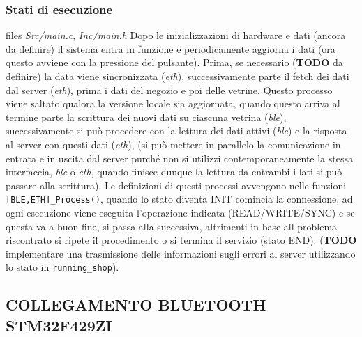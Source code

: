 \documentclass{article}
\begin{document}
\subsubsection{Stati di esecuzione}
files \textit{Src/main.c}, \textit{Inc/main.h}
Dopo le inizializzazioni di hardware e dati (ancora da definire) il sistema entra in funzione e periodicamente aggiorna i dati (ora questo avviene con la pressione del pulsante). Prima, se necessario (\textbf{TODO} da definire) la data viene sincronizzata (\textit{eth}), successivamente parte il fetch dei dati dal server (\textit{eth}), prima i dati del negozio e poi delle vetrine. Questo processo viene saltato qualora la versione locale sia aggiornata, quando questo arriva al termine parte la scrittura dei nuovi dati su ciascuna vetrina (\textit{ble}), successivamente si pu\`{o} procedere con la lettura dei dati attivi (\textit{ble}) e la risposta al server con questi dati (\textit{eth}), (si pu\`{o} mettere in parallelo la comunicazione in entrata e in uscita dal server purch\'{e} non si utilizzi contemporaneamente la stessa interfaccia, \textit{ble} o \textit{eth}, quando finisce dunque la lettura da entrambi i lati si pu\`{o} passare alla scrittura). Le definizioni di questi processi avvengono nelle funzioni \texttt{[BLE,ETH]\_Process()}, quando lo stato diventa INIT comincia la connessione, ad ogni esecuzione viene eseguita l'operazione indicata (READ/WRITE/SYNC) e se questa va a buon fine, si passa alla successiva, altrimenti in base all problema riscontrato si ripete il procedimento o si termina il servizio (stato END). (\textbf{TODO} implementare una trasmissione delle informazioni sugli errori al server utilizzando lo stato in \texttt{running\_shop}). 


\subsection{COLLEGAMENTO BLUETOOTH STM32F429ZI}
\end{document}
